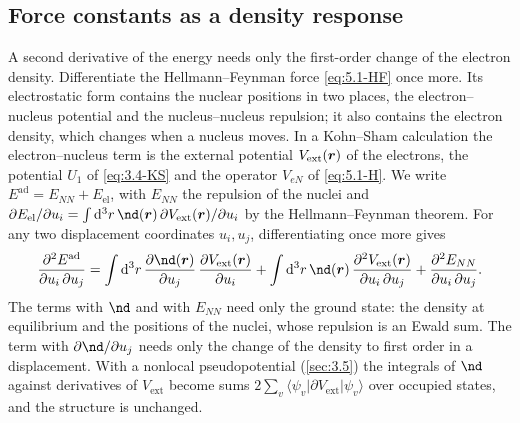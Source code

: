 \subsection{Force constants as a density response}

A second derivative of the energy needs only the first-order change of the electron density. Differentiate the Hellmann--Feynman force \cref{eq:5.1-HF} once more. Its electrostatic form contains the nuclear positions in two places, the electron--nucleus potential and the nucleus--nucleus repulsion; it also contains the electron density, which changes when a nucleus moves. In a Kohn--Sham calculation the electron--nucleus term is the external potential $V_{\mathrm{ext}}(\bm{r})$ of the electrons, the potential $U_1$ of \cref{eq:3.4-KS} and the operator $V_{eN}$ of \cref{eq:5.1-H}. We write $E^{\mathrm{ad}} = E_{NN} + E_{\mathrm{el}}$, with $E_{NN}$ the repulsion of the nuclei and $\partial E_{\mathrm{el}}/\partial u_i = \int\dd^3r\,\nd(\vect{r})\,\partial V_{\mathrm{ext}}(\vect{r})/\partial u_i$ by the Hellmann--Feynman theorem. For any two displacement coordinates $u_i, u_j$, differentiating once more gives~\cite[Eq.~(10)]{baroni2001phonons}
\begin{equation}
  \frac{\partial^2E^{\mathrm{ad}}}{\partial u_i\,\partial u_j}
  = \int\dd^3r\,\frac{\partial\nd(\vect{r})}{\partial u_j}\,\frac{\partial V_{\mathrm{ext}}(\vect{r})}{\partial u_i}
  + \int\dd^3r\,\nd(\vect{r})\,\frac{\partial^2V_{\mathrm{ext}}(\vect{r})}{\partial u_i\,\partial u_j}
  + \frac{\partial^2E_{NN}}{\partial u_i\,\partial u_j} .
  \label{eq:5.4-hess}
\end{equation}
The terms with $\nd$ and with $E_{NN}$ need only the ground state: the density at equilibrium and the positions of the nuclei, whose repulsion is an Ewald sum. The term with $\partial\nd/\partial u_j$ needs only the change of the density to first order in a displacement. With a nonlocal pseudopotential (\cref{sec:3.5}) the integrals of $\nd$ against derivatives of $V_{\mathrm{ext}}$ become sums $2\sum_v\langle\psi_v|\partial V_{\mathrm{ext}}|\psi_v\rangle$ over occupied states, and the structure is unchanged.

